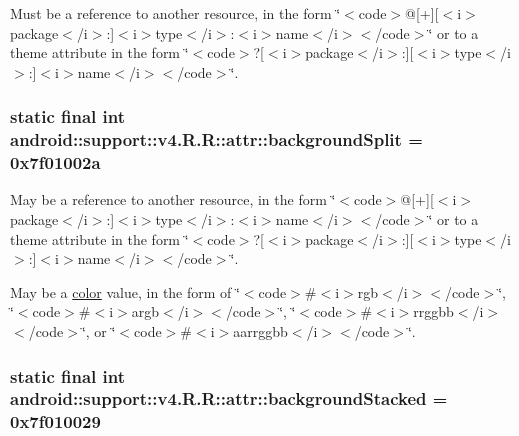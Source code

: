 Must be a reference to another resource, in the form \char`\"{}$<$code$>$@\mbox{[}+\mbox{]}\mbox{[}$<$i$>$package$<$/i$>$:\mbox{]}$<$i$>$type$<$/i$>$:$<$i$>$name$<$/i$>$$<$/code$>$\char`\"{} or to a theme attribute in the form \char`\"{}$<$code$>$?\mbox{[}$<$i$>$package$<$/i$>$:\mbox{]}\mbox{[}$<$i$>$type$<$/i$>$:\mbox{]}$<$i$>$name$<$/i$>$$<$/code$>$\char`\"{}. \hypertarget{classandroid_1_1support_1_1v4_1_1_r_1_1attr_2ae66bb3fea2057686b3d65927bfee86}{
\subsubsection[{backgroundSplit}]{\setlength{\rightskip}{0pt plus 5cm}static final int android::support::v4.R.R::attr::backgroundSplit = 0x7f01002a}}
\label{classandroid_1_1support_1_1v4_1_1_r_1_1attr_2ae66bb3fea2057686b3d65927bfee86}


May be a reference to another resource, in the form \char`\"{}$<$code$>$@\mbox{[}+\mbox{]}\mbox{[}$<$i$>$package$<$/i$>$:\mbox{]}$<$i$>$type$<$/i$>$:$<$i$>$name$<$/i$>$$<$/code$>$\char`\"{} or to a theme attribute in the form \char`\"{}$<$code$>$?\mbox{[}$<$i$>$package$<$/i$>$:\mbox{]}\mbox{[}$<$i$>$type$<$/i$>$:\mbox{]}$<$i$>$name$<$/i$>$$<$/code$>$\char`\"{}. 

May be a \hyperlink{classandroid_1_1support_1_1v4_1_1_r_1_1color}{color} value, in the form of \char`\"{}$<$code$>$\#$<$i$>$rgb$<$/i$>$$<$/code$>$\char`\"{}, \char`\"{}$<$code$>$\#$<$i$>$argb$<$/i$>$$<$/code$>$\char`\"{}, \char`\"{}$<$code$>$\#$<$i$>$rrggbb$<$/i$>$$<$/code$>$\char`\"{}, or \char`\"{}$<$code$>$\#$<$i$>$aarrggbb$<$/i$>$$<$/code$>$\char`\"{}. \hypertarget{classandroid_1_1support_1_1v4_1_1_r_1_1attr_75bf34978867c32d8c16c06be8fdf929}{
\subsubsection[{backgroundStacked}]{\setlength{\rightskip}{0pt plus 5cm}static final int android::support::v4.R.R::attr::backgroundStacked = 0x7f010029}}
\label{classandroid_1_1support_1_1v4_1_1_r_1_1attr_75bf34978867c32d8c16c06be8fdf929}


